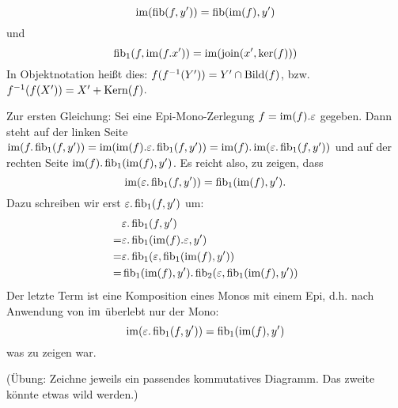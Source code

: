 \begin{lemm}[Regel (e)]
\[
\im(\fib(f,y')) = \fib(\im(f),y')
\]
und
\[
\fib_1(f,\im(f.x')) = \im(\join(x', \ker(f)))
\]
In Objektnotation heißt dies: $f(f^{-1}(Y')) = Y' \cap \Bild(f)$, bzw. $f^{-1}(f(X')) = X' + \Kern(f)$.
\end{lemm}
\begin{bew}
Zur ersten Gleichung:
Sei eine Epi-Mono-Zerlegung $f=\im(f).\varepsilon$ gegeben.
Dann steht auf der linken Seite $\im(f.\fib_1(f,y')) = \im(\im(f).\varepsilon.\fib_1(f,y')) = \im(f).\im(\varepsilon.\fib_1(f,y'))$ und auf der rechten Seite $\im(f).\fib_1(\im(f),y')$. Es reicht also, zu zeigen, dass
\[ \im(\varepsilon.\fib_1(f,y')) = \fib_1(\im(f),y'). \]
Dazu schreiben wir erst $\varepsilon.\fib_1(f,y')$ um:
\begin{align*}
&\varepsilon.\fib_1(f,y')
\\=& \varepsilon.\fib_1(\im(f).\varepsilon,y')
\\=& \varepsilon.\fib_1(\varepsilon,\fib_1(\im(f),y'))
\\=& \fib_1(\im(f),y').\fib_2(\varepsilon,\fib_1(\im(f),y'))
\end{align*}
Der letzte Term ist eine Komposition eines Monos mit einem Epi, d.h. nach Anwendung von $\im$ überlebt nur der Mono:
\[ \im(\varepsilon.\fib_1(f,y')) = \fib_1(\im(f),y') \]
was zu zeigen war.

% 
% 
% 
(Übung: Zeichne jeweils ein passendes kommutatives Diagramm. Das zweite könnte etwas wild werden.)
\end{bew}

